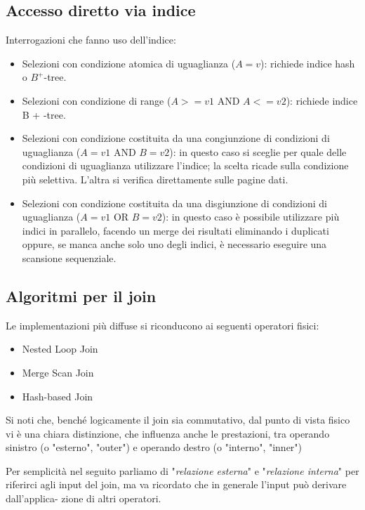 \documentclass[a4paper, 10pt]{article}
\theoremstyle{definition}
\begin{document}
			\subsection*{Accesso diretto via indice}
				Interrogazioni che fanno uso dell'indice:
				\begin{itemize}
					\item Selezioni con condizione atomica di uguaglianza ($ A = v $):
						\subitem richiede indice hash o $ B^+ $-tree.
					\item Selezioni con condizione di range ($ A >= v1 $ AND $ A <= v2 $):
						\subitem richiede indice B + -tree.
					\item Selezioni con condizione costituita da una congiunzione di
					condizioni di uguaglianza ($ A = v1 $ AND $ B = v2 $):
						\subitem in questo caso si sceglie per quale delle condizioni di uguaglianza
						utilizzare l'indice; la scelta ricade sulla condizione più selettiva. L'altra si
						verifica direttamente sulle pagine dati.
					\item Selezioni con condizione costituita da una disgiunzione di
					condizioni di uguaglianza ($ A = v1 $ OR $ B = v2 $):
						\subitem in questo caso è possibile utilizzare più indici in parallelo, facendo un
						merge dei risultati eliminando i duplicati oppure, se manca anche solo
						uno degli indici, è necessario eseguire una scansione sequenziale.
				\end{itemize}
				
			\subsection*{Algoritmi per il join}
				Le implementazioni più diffuse si riconducono ai seguenti
				operatori fisici:
				\begin{itemize}
					\item Nested Loop Join
					\item Merge Scan Join
					\item Hash-based Join
				\end{itemize}
				Si noti che, benché logicamente il join sia commutativo, dal
				punto di vista fisico vi è una chiara distinzione, che influenza
				anche le prestazioni, tra operando sinistro (o "esterno",
				"outer") e operando destro (o "interno", "inner")
				
				\noindent
				Per semplicità nel seguito parliamo di "\textit{relazione esterna}" e
				"\textit{relazione interna}" per riferirci agli input del join, ma va
				ricordato che in generale l'input può derivare dall'applica-
				zione di altri operatori.
				
\end{document}
